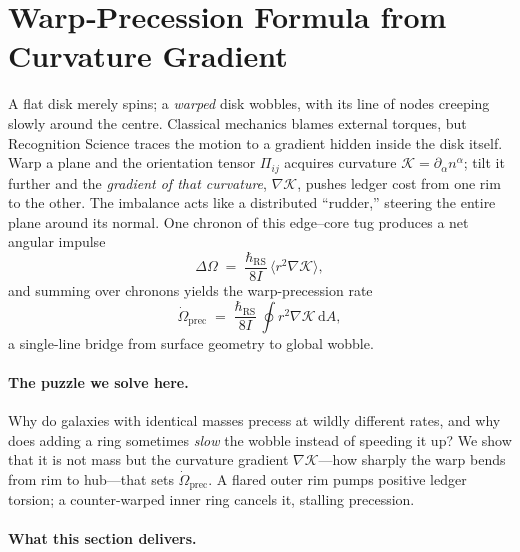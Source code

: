 \documentclass[11pt,oneside]{book}
\begin{document}

\section{Warp‐Precession Formula from Curvature Gradient}
\label{sec:warp-precession-narrative}

A flat disk merely spins; a \emph{warped} disk wobbles, with its line
of nodes creeping slowly around the centre.  Classical mechanics blames
external torques, but Recognition Science traces the motion to a
gradient hidden inside the disk itself.  Warp a plane and the
orientation tensor \(\Pi_{ij}\) acquires curvature
\(\mathcal K = \partial_\alpha n^\alpha\); tilt it further and the
\emph{gradient of that curvature},
\(\nabla\mathcal K\), pushes ledger cost from one rim to the other.
The imbalance acts like a distributed “rudder,” steering the entire
plane around its normal.  One chronon of this edge–core tug produces a
net angular impulse
\[
   \Delta\Omega
   \;=\;
   \frac{\hbar_{\mathrm{RS}}}{8I}\,
   \bigl\langle r^{2}\nabla\mathcal K \bigr\rangle,
\]
and summing over chronons yields the warp-precession rate
\[
   \dot{\Omega}_{\mathrm{prec}}
   \;=\;
   \frac{\hbar_{\mathrm{RS}}}{8I}\,
   \oint  r^{2}\nabla\mathcal K \,\mathrm dA,
\]
a single-line bridge from surface geometry to global wobble.

\paragraph{The puzzle we solve here.}
Why do galaxies with identical masses precess at wildly different
rates, and why does adding a ring sometimes \emph{slow} the wobble
instead of speeding it up?  
We show that it is not mass but the curvature gradient
\(\nabla\mathcal K\)—how sharply the warp bends from rim to hub—that
sets \(\dot{\Omega}_{\mathrm{prec}}\).  A flared outer rim pumps
positive ledger torsion; a counter-warped inner ring cancels it,
stalling precession.

\paragraph{What this section delivers.}
\end{document}
